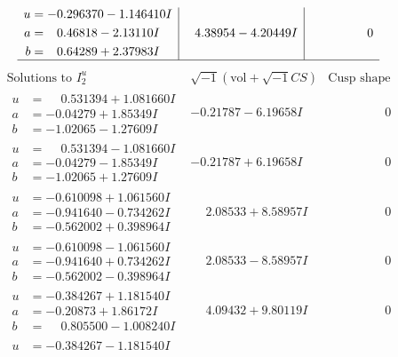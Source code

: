 \documentclass[1p]{elsarticle_modified}
\theoremstyle{definition}
\newcommand{\I}{\sqrt{-1}}
\begin{document}
$$\begin{array}{c|c|c}
\begin{aligned}
u &= -0.296370 - 1.146410 I \\
a &= \phantom{-}0.46818 - 2.13110 I \\
b &= \phantom{-}0.64289 + 2.37983 I\end{aligned}
 & \phantom{-}4.38954 - 4.20449 I & \phantom{-0.000000 } 0\\
 \hline 
 \end{array}$$\newpage$$\begin{array}{c|c|c}  
\text{Solutions to }I^u_{2}& \I (\text{vol} + \sqrt{-1}CS) & \text{Cusp shape}\\
 \hline 
\begin{aligned}
u &= \phantom{-}0.531394 + 1.081660 I \\
a &= -0.04279 + 1.85349 I \\
b &= -1.02065 - 1.27609 I\end{aligned}
 & -0.21787 - 6.19658 I & \phantom{-0.000000 } 0 \\ \hline\begin{aligned}
u &= \phantom{-}0.531394 - 1.081660 I \\
a &= -0.04279 - 1.85349 I \\
b &= -1.02065 + 1.27609 I\end{aligned}
 & -0.21787 + 6.19658 I & \phantom{-0.000000 } 0 \\ \hline\begin{aligned}
u &= -0.610098 + 1.061560 I \\
a &= -0.941640 - 0.734262 I \\
b &= -0.562002 + 0.398964 I\end{aligned}
 & \phantom{-}2.08533 + 8.58957 I & \phantom{-0.000000 } 0 \\ \hline\begin{aligned}
u &= -0.610098 - 1.061560 I \\
a &= -0.941640 + 0.734262 I \\
b &= -0.562002 - 0.398964 I\end{aligned}
 & \phantom{-}2.08533 - 8.58957 I & \phantom{-0.000000 } 0 \\ \hline\begin{aligned}
u &= -0.384267 + 1.181540 I \\
a &= -0.20873 + 1.86172 I \\
b &= \phantom{-}0.805500 - 1.008240 I\end{aligned}
 & \phantom{-}4.09432 + 9.80119 I & \phantom{-0.000000 } 0 \\ \hline\begin{aligned}
u &= -0.384267 - 1.181540 I \\

\end{aligned}
\end{array}$$
\end{document}
